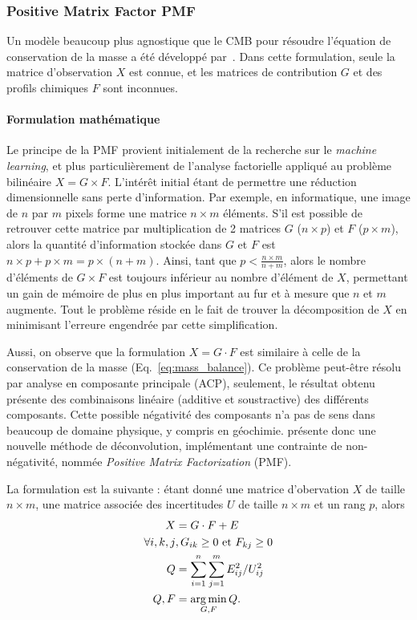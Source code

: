 \subsubsection{Positive Matrix Factor PMF}%
\label{ssub:pmf}

Un modèle beaucoup plus agnostique que le CMB pour résoudre l'équation de conservation de
la masse a été développé par~\textcite{paateroPositive1994}. Dans cette formulation,
seule la matrice d'observation $X$ est connue, et les matrices de contribution $G$ et des
profils chimiques $F$ sont inconnues.

\paragraph{Formulation mathématique}%
\label{par:formulation_mathématique}

Le principe de la PMF provient initialement de la recherche sur le \textit{machine
learning}, et plus particulièrement de l'analyse factorielle appliqué au problème
bilinéaire $X=G\times F$. L'intérêt initial étant de permettre une réduction
dimensionnelle sans perte d'information. Par exemple, en informatique, une image de $n$
par $m$ pixels forme une matrice $n\times m$ éléments. S'il est possible de retrouver
cette matrice par multiplication de 2 matrices $G$ ($n\times p$) et $F$ ($p \times m$),
alors la quantité d'information stockée dans $G$ et $F$ est $n
\times p + p \times m = p \times (n + m)$. Ainsi, tant que $p < \frac{n\times m}{n+m}$,
alors le nombre d'éléments de $G\times F$ est toujours inférieur au nombre d'élément de
$X$, permettant un gain de mémoire de plus en plus important au fur et à mesure que $n$ et
$m$ augmente.
Tout le problème réside en le fait de trouver la décomposition de $X$ en minimisant
l'erreure engendrée par cette simplification.

Aussi, on observe que la formulation $X = G\cdot F$ est similaire à celle de
la conservation de la masse (Eq.~\ref{eq:mass_balance}). Ce problème peut-être résolu par
analyse en composante principale (ACP), seulement, le résultat obtenu présente des
combinaisons linéaire (additive et soustractive) des différents composants. Cette possible
négativité des composants n'a pas de sens dans beaucoup de domaine physique, y compris en
géochimie. \textcite{paateroPositive1994} présente donc une nouvelle méthode de
déconvolution, implémentant une contrainte de non-négativité, nommée \textit{Positive Matrix
Factorization} (PMF). 

La formulation est la suivante : étant donné une matrice d'obervation $X$ de taille
$n\times m$, une matrice associée des incertitudes $U$ de taille $n \times m$ et un rang
$p$, alors 
\begin{align}
    \label{eq:pmf_formulation}
    X &= G \cdot F + E \\
    \forall i,k,j &, G_{ik}\geq 0 \text{ et } F_{kj}\geq 0\\
    Q &= \sum_{i=1}^n\sum_{j=1}^m E_{ij}^2/U_{ij}^2\\
    {Q, F} &= \operatorname*{arg\,min}_{G,F} Q.
\end{align}

